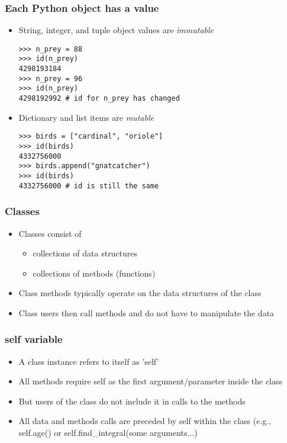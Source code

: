 \documentclass{beamer}
\begin{document}
\begin{frame}[fragile]
\frametitle{Each Python object has a value}
\begin{itemize}
\item String, integer, and tuple object values are \emph{immutable}
\begin{lstlisting}
>>> n_prey = 88
>>> id(n_prey)
4298193184
>>> n_prey = 96
>>> id(n_prey)
4298192992 # id for n_prey has changed
\end{lstlisting}
\item Dictionary and list items are \emph{mutable}
\begin{lstlisting}
>>> birds = ["cardinal", "oriole"]
>>> id(birds)
4332756000
>>> birds.append("gnatcatcher")
>>> id(birds)
4332756000 # id is still the same
\end{lstlisting}
\end{itemize}
\end{frame}

\begin{frame}[fragile]
\frametitle{Classes}
\begin{itemize}
\item Classes consist of
\begin{itemize}
\item collections of data structures
\item collections of methods (functions)
\end{itemize}
\item Class methods typically operate on the data structures of the class
\item Class users then call methods and do not have to manipulate the data
\end{itemize}
\end{frame}

\begin{frame}[fragile]
\frametitle{self variable}
\begin{itemize}
\item A class instance refers to itself as 'self'
\item All methods require self as the first argument/parameter inside the class
\item But users of the class do not include it in calls to the methods 
\item All data and methods calls are preceded by self within the class (e.g., self.age() or self.find\_integral(some arguments...)
\end{itemize}
\end{frame}
\end{document}
